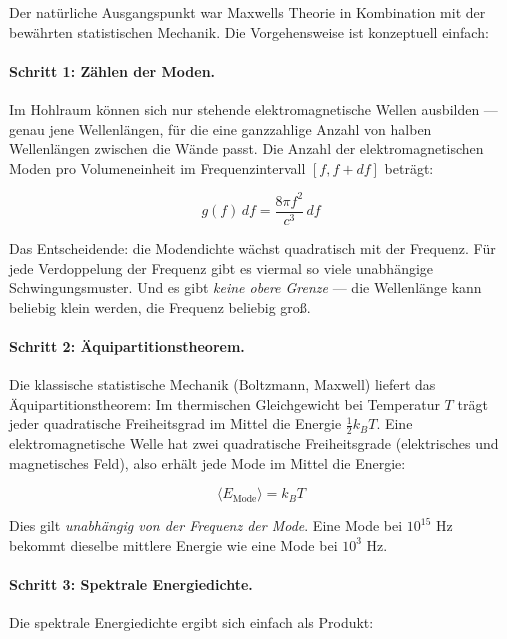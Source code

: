 Der natürliche Ausgangspunkt war Maxwells Theorie in Kombination mit der bewährten 
statistischen Mechanik. Die Vorgehensweise ist konzeptuell einfach:

\paragraph{Schritt 1: Zählen der Moden.}
Im Hohlraum können sich nur stehende elektromagnetische Wellen ausbilden — genau jene 
Wellenlängen, für die eine ganzzahlige Anzahl von halben Wellenlängen zwischen die 
Wände passt. Die Anzahl der elektromagnetischen Moden pro Volumeneinheit im 
Frequenzintervall $[f, f + df]$ beträgt:

\begin{equation}
    g(f) \, df = \frac{8\pi f^2}{c^3} \, df
    \label{eq:mode_density}
\end{equation}

Das Entscheidende: die Modendichte wächst quadratisch mit der Frequenz. Für jede 
Verdoppelung der Frequenz gibt es viermal so viele unabhängige Schwingungsmuster. 
Und es gibt \emph{keine obere Grenze} — die Wellenlänge kann beliebig klein werden, 
die Frequenz beliebig groß.

\paragraph{Schritt 2: Äquipartitionstheorem.}
Die klassische statistische Mechanik (Boltzmann, Maxwell) liefert das 
Äquipartitionstheorem: Im thermischen Gleichgewicht bei Temperatur $T$ trägt jeder 
quadratische Freiheitsgrad im Mittel die Energie $\frac{1}{2} k_B T$. Eine 
elektromagnetische Welle hat zwei quadratische Freiheitsgrade (elektrisches und 
magnetisches Feld), also erhält jede Mode im Mittel die Energie:

\begin{equation}
    \langle E_{\text{Mode}} \rangle = k_B T
    \label{eq:equipartition}
\end{equation}

Dies gilt \emph{unabhängig von der Frequenz der Mode}. Eine Mode bei $10^{15}$ Hz 
bekommt dieselbe mittlere Energie wie eine Mode bei $10^3$ Hz.

\paragraph{Schritt 3: Spektrale Energiedichte.}
Die spektrale Energiedichte ergibt sich einfach als Produkt:


